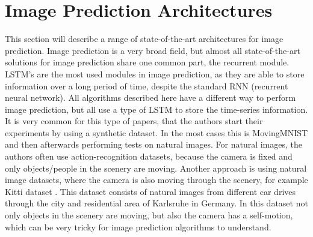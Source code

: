 \section{Image Prediction Architectures} \label{section::related}
 This section will describe a range of state-of-the-art architectures for image prediction. Image prediction is a very broad field, but almost all state-of-the-art solutions
 for image prediction share one common part, the recurrent module. LSTM's are the most used modules in image prediction, as they are able to store information over a long period of time, despite
 the standard RNN (recurrent neural network). All algorithms described here have a different way to perform image prediction, but all use a type of LSTM to store the time-series information.
 It is very common for this type of papers, that the authors start their experiments by using a synthetic dataset. In the most cases this is MovingMNIST \cite{LeCun1998} and then afterwards performing
 tests on natural images. For natural images, the authors often use action-recognition datasets, because the camera is fixed and only objects/people in the scenery are moving. Another approach
 is using natural image datasets, where the camera is also moving through the scenery, for example Kitti dataset \cite{Geiger2013}. This dataset consists of natural images from different car
 drives through the city and residential area of Karlsruhe in Germany.
 In this dataset not only objects in the scenery are moving, but also the camera has a self-motion, which can be very tricky for image prediction algorithms to \glqq understand\grqq.
 
